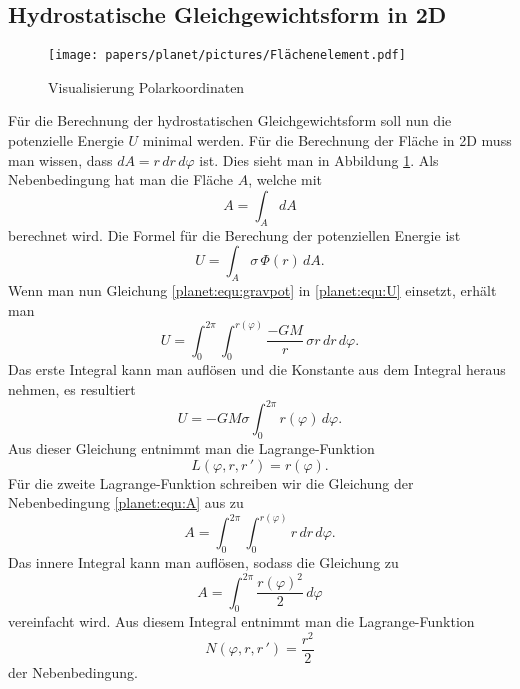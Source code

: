 \subsection{Hydrostatische Gleichgewichtsform in 2D}
\begin{figure}
	\centering
	\texttt{[image: papers/planet/pictures/Flächenelement.pdf]}
	\caption{Visualisierung Polarkoordinaten}
	\label{planet:fig:2d}
\end{figure}
Für die Berechnung der hydrostatischen Gleichgewichtsform soll nun die potenzielle Energie \(U\) minimal werden.
Für die Berechnung der Fläche in 2D muss man wissen, dass \(dA = r \, dr \, d\varphi\) ist.
Dies sieht man in Abbildung \ref{planet:fig:2d}.
Als Nebenbedingung hat man die Fläche \(A\), welche mit 
\begin{equation}
	A = \int_{A}^{} dA
	\label{planet:equ:A}
\end{equation}
berechnet wird.
Die Formel für die Berechung der potenziellen Energie ist
\begin{equation}
	U = \int_{A} \sigma \, \Phi (r) \, dA.
	\label{planet:equ:U}
\end{equation}
Wenn man nun Gleichung \eqref{planet:equ:gravpot} in \eqref{planet:equ:U} einsetzt, erhält man
\begin{equation*}
	U = \int_{0}^{2\pi}\int_{0}^{r(\varphi)} \frac{-GM}{r} \, \sigma r \, dr \, d\varphi.
\end{equation*}
Das erste Integral kann man auflösen und die Konstante aus dem Integral heraus nehmen, es resultiert 
\begin{equation*}
	U =-GM\sigma \int_{0}^{2\pi} r(\varphi) \, d\varphi .
\end{equation*}
Aus dieser Gleichung entnimmt man die Lagrange-Funktion
\begin{equation*}
	L(\varphi ,r,r\,') = r(\varphi).
\end{equation*}
Für die zweite Lagrange-Funktion schreiben wir die Gleichung der Nebenbedingung \eqref{planet:equ:A} aus zu
\begin{equation*}
	A = \int_{0}^{2\pi}\int_{0}^{r(\varphi)} r \, dr \, d\varphi.
\end{equation*}
Das innere Integral kann man auflösen, sodass die Gleichung zu
\begin{equation*}
	A = \int_{0}^{2\pi}\frac{r(\varphi)^2}{2} \, d\varphi
\end{equation*}
vereinfacht wird.
Aus diesem Integral entnimmt man die Lagrange-Funktion
\begin{equation*}
	N(\varphi ,r,r\,') = \frac{r^2}{2}
\end{equation*}
der Nebenbedingung.

